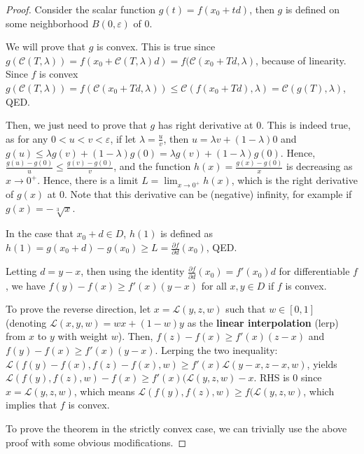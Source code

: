 \begin{proof}
  Consider the scalar function \( g(t) = f(x_{0}+t d) \), then \( g \) is
  defined on some neighborhood \( B(0, \varepsilon) \) of \( 0 \).

  We will prove that \( g \) is convex. This is true since \( g(\mathcal{C}(T,
  \lambda)) = f(x_{0} + \mathcal{C}(T, \lambda)d) = f(\mathcal{C}(x_{0} + Td,
  \lambda) \), because of linearity. Since \( f \) is convex \( g(\mathcal{C}(T,
  \lambda)) = f(\mathcal{C}(x_{0}+Td, \lambda)) \le \mathcal{C}(f(x_{0}+Td),
  \lambda) = \mathcal{C}(g(T), \lambda) \), QED.

  Then, we just need to prove that \( g \) has right derivative at \( 0 \). This
  is indeed true, as for any \( 0 < u < v < \varepsilon \), if let \( \lambda =
  \frac{u}{v}\), then \( u = \lambda v + (1 - \lambda) 0 \) and \( g(u) \le
  \lambda g(v) + (1- \lambda)g(0) = \lambda g(v) + (1 - \lambda)g(0) \). Hence,
  \( \frac{g(u) - g(0)}{u} \le  \frac{g(v) - g(0)}{v} \), and the function
  \( h(x) = \frac{g(x) - g(0)}{x} \) is decreasing as \( x \to  0^{+} \). Hence,
  there is a limit \( L = \lim_{x \to 0^{+}} h(x)  \), which is the right
  derivative of \( g(x) \) at \( 0 \). Note that this derivative can be
  (negative) infinity, for example if \( g(x) = -\sqrt[3]{x}  \).

  In the case that \( x_{0} + d \in D \), \( h(1) \) is defined as \( h(1) =
  g(x_{0}  + d) - g(x_{0}) \ge  L = \frac{\partial f}{\partial d}(x_{0})  \), QED.

  Letting \( d = y - x \), then using the identity \( \frac{\partial f}{\partial
  d} (x_{0}) = f'(x_{0})d \) for differentiable \( f \), we have \( f(y)-f(x)
  \ge f'(x)(y-x) \) for all \( x, y \in D \) if \( f \) is convex.

  To prove the reverse direction, let \( x = \mathcal{L}(y, z, w) \) such that \(
  w \in [0, 1]\) (denoting \( \mathcal{L}(x, y, w) = wx + (1-w)y \) as the
  \textbf{linear interpolation} (lerp) from \( x \) to \( y \) with weight \( w \)).
  Then, \( f(z)-f(x) \ge f'(x)(z-x) \) and \( f(y)-f(x) \ge f'(x)(y-x) \).
  Lerping the two inequality: \( \mathcal{L}(f(y)-f(x),f(z)-f(x),w) \ge
  f'(x)\mathcal{L}(y-x, z-x, w) \), yields \( \mathcal{L}(f(y), f(z), w) - f(x)
  \ge  f'(x)(\mathcal{L}(y,z,w)-x\). RHS is \( 0 \) since \( x =
  \mathcal{L}(y,z,w) \), which means \( \mathcal{L}(f(y), f(z), w) \ge
  f(\mathcal{L}(y,z,w) \), which implies that \( f \) is convex.

  To prove the theorem in the strictly convex case, we can trivially use the
  above proof with some obvious modifications.
\end{proof}

